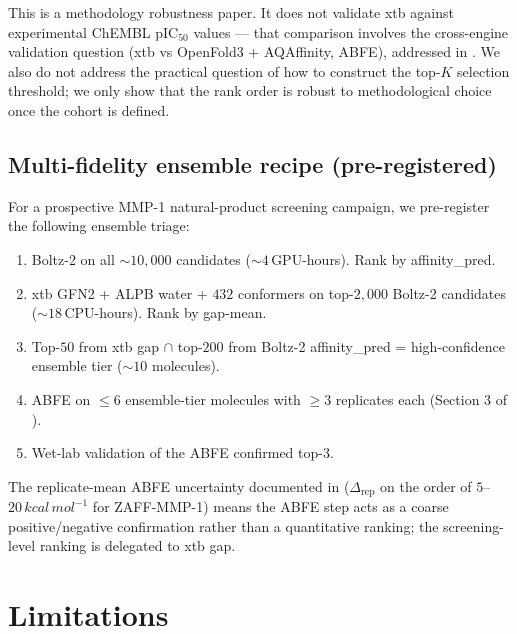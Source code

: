 \documentclass[11pt,a4paper]{article}
\begin{document}
This is a methodology robustness paper. It does not validate xtb
against experimental ChEMBL pIC$_{50}$ values --- that comparison
involves the cross-engine validation question (xtb vs OpenFold3 +
AQAffinity, ABFE), addressed in \citet{paper_a_2026}. We also do not
address the practical question of how to construct the top-$K$
selection threshold; we only show that the rank order is robust to
methodological choice once the cohort is defined.

\subsection{Multi-fidelity ensemble recipe (pre-registered)}

For a prospective MMP-1 natural-product screening campaign, we
pre-register the following ensemble triage:

\begin{enumerate}[leftmargin=*]
  \item Boltz-2 on all $\sim 10{,}000$ candidates ($\sim 4$\,GPU-hours).
    Rank by affinity\_pred.
  \item xtb GFN2 + ALPB water + $432$ conformers on top-$2{,}000$
    Boltz-2 candidates ($\sim 18$\,CPU-hours). Rank by gap-mean.
  \item Top-$50$ from xtb gap $\cap$ top-$200$ from Boltz-2
    affinity\_pred = high-confidence ensemble tier ($\sim 10$ molecules).
  \item ABFE on $\leq 6$ ensemble-tier molecules with $\geq 3$
    replicates each (Section 3 of \citealp{paper_a_2026}).
  \item Wet-lab validation of the ABFE confirmed top-$3$.
\end{enumerate}

The replicate-mean ABFE uncertainty documented in
\citet{paper_a_2026} ($\Delta_{\text{rep}}$ on the order of
$5$--$20\,\unit{kcal\,mol^{-1}}$ for ZAFF-MMP-1) means the ABFE step
acts as a coarse positive/negative confirmation rather than a
quantitative ranking; the screening-level ranking is delegated to
xtb gap.

\section{Limitations}
\label{sec:limitations}
\end{document}
